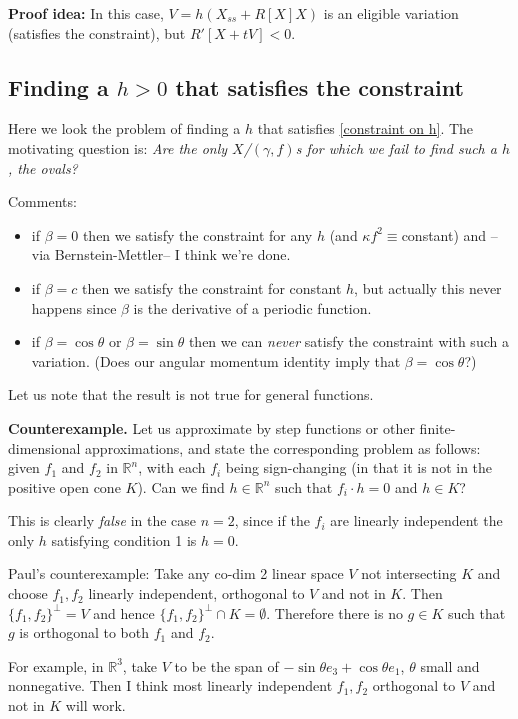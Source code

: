 \documentclass[12pt, a4paper]{amsart}
\theoremstyle{remark}
\begin{document}
\textbf{Proof idea:}  In this case, $V=h(X_{ss}+ R[X]X)$ is an eligible variation (satisfies the constraint), but $R'[X+tV]<0$.   





\subsection*{Finding a $h>0$ that satisfies the constraint} Here we look the problem of finding a $h$ that satisfies \eqref{constraint on h}.   The motivating question is: \emph{ Are the only $X$/$(\gamma,f)$s for which we fail to find such a $h$, the ovals?}

Comments:
\begin{itemize}
\item if $\beta=0$ then we satisfy the constraint for any $h$ (and $\kappa f^2\equiv $constant)   and --via Bernstein-Mettler-- I think we're done.  
\item if $\beta=c$ then we satisfy the constraint for constant $h$, but actually this never happens since $\beta$ is the derivative of a periodic function.   
\item if $\beta=\cos\theta$ or $\beta=\sin\theta$ then we can \emph{never} satisfy the constraint with such a variation. (Does our angular momentum identity imply that $\beta=\cos\theta$?)
\end{itemize}

Let us note that the result is not true for general functions.

\textbf{Counterexample.} Let us approximate by step functions or other finite-dimensional approximations, and state the corresponding problem as follows:    given $f_1$ and $f_2$ in 
$\mathbb{R}^n$, with each $f_i$ being sign-changing (in that it is not in the positive open cone $K$).    Can we find $h\in\mathbb{R}^n$ such that $f_i\cdot h=0$ and $h\in K$?

This is clearly \emph{false} in the case $n=2$, since if the $f_i$ are linearly independent the only $h$ satisfying condition 1 is $h=0$.

Paul's counterexample:       Take any co-dim 2 linear space $V$ not intersecting $K$ and choose $f_1, f_2$ linearly independent, orthogonal to $V$ and not in $K$. Then $\{f_1, f_2\}^{\perp} = V$ and hence $\{f_1, f_2\}^{\perp} \cap K = \emptyset$. Therefore there is no $g \in K$ such that $g$ is orthogonal to both $f_1$ and $f_2$.

 For example, in $\mathbb{R}^3$, take $V$ to be the span of $-\sin\theta e_3 + \cos\theta e_1$, $\theta$ small and nonnegative.  Then I think most linearly independent $f_1, f_2$ orthogonal to $V$ and not in $K$ will work.
 
\end{document}
